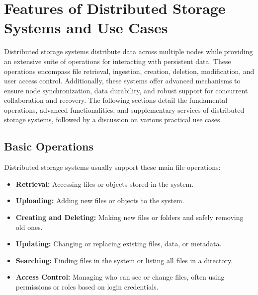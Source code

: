 \chapter{Features of Distributed Storage Systems and Use Cases} \label{chap:features}

Distributed storage systems distribute data across multiple nodes while providing an extensive suite of operations for interacting with persistent data. These operations encompass file retrieval, ingestion, creation, deletion, modification, and user access control. Additionally, these systems offer advanced mechanisms to ensure node synchronization, data durability, and robust support for concurrent collaboration and recovery. The following sections detail the fundamental operations, advanced functionalities, and supplementary services of distributed storage systems, followed by a discussion on various practical use cases.

\section{Basic Operations}
Distributed storage systems usually support these main file operations:
\begin{itemize}
    \item \textbf{Retrieval:} Accessing files or objects stored in the system.
    \item \textbf{Uploading:} Adding new files or objects to the system.
    \item \textbf{Creating and Deleting:} Making new files or folders and safely removing old ones.
    \item \textbf{Updating:} Changing or replacing existing files, data, or metadata.
    \item \textbf{Searching:} Finding files in the system or listing all files in a directory.
    \item \textbf{Access Control:} Managing who can see or change files, often using permissions or roles based on login credentials.
\end{itemize}

